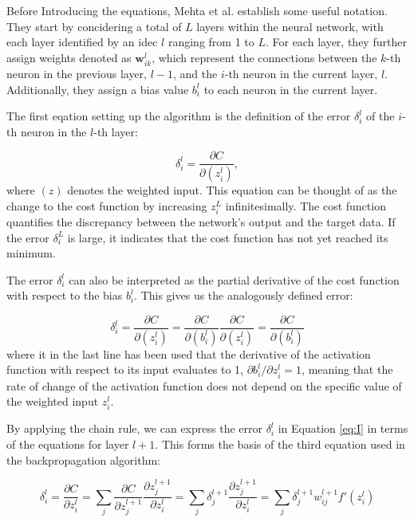 \documentclass[a4paper, UKenglish, 11pt]{uiomaster}
\begin{document}
Before Introducing the equations, Mehta et al. establish some useful notation. They start by concidering a total of $L$ layers within the neural network, with each layer identified by an idec $l$ ranging from 1 to $L$. For each layer, they further assign weights denoted as $\mathbf{w}^l_{ik}$, which represent the connections between the $k$-th neuron in the previous layer, $l-1$, and the $i$-th neuron in the current layer, $l$. Additionally, they assign a bias value $b^l_i$ to each neuron in the current layer.

The first eqation setting up the algorithm is the definition of the error $\delta_i^l$ of the $i$-th neuron in the $l$-th layer:

\begin{equation}
    \delta_i^l = \frac{\partial C}{\partial(z_i^l)},
\label{eq:I}
\end{equation}
where $(z)$ denotes the weighted input. This equation can be thought of as the change to the cost function by increasing $z_i^L$ infinitesimally. The cost function quantifies the discrepancy between the network's output and the target data. If the error $\delta_i^L$ is large, it indicates that the cost function has not yet reached its minimum.

The error $\delta^l_i$ can also be interpreted as the partial derivative of the cost function with respect to the bias $b^l_i$. This gives us the analogously defined error:

\begin{equation}
    \delta_i^l = \frac{\partial C}{\partial(z_i^l)} = \frac{\partial C}{\partial(b_i^l)}\frac{\partial C}{\partial(z_i^l)} = \frac{\partial C}{\partial(b_i^l)}
\label{eq:II}
\end{equation}
where it in the last line has been used that the derivative of the activation function with respect to its input evaluates to 1, $\partial b^l_i / \partial z_i^l = 1$, meaning that the rate of change of the activation function does not depend on the specific value of the weighted input $z_i^l$.

By applying the chain rule, we can express the error $\delta_i^l$ in Equation \ref{eq:I} in terms of the equations for layer $l+1$. This forms the basis of the third equation used in the backpropagation algorithm:

\begin{equation}
\delta_i^l = \frac{\partial C}{\partial z^l_{i}} =
\sum_j \frac{\partial C}{\partial z_j^{l+1}}\frac{\partial z_j^{l+1}}{\partial z_i^l} =
\sum_j \delta_j^{l+1} \frac{\partial z_j^{l+1}}{\partial z_i^l} =
\sum_j \delta_j^{l+1}w_{ij}^{l+1}f'(z_i^l)
\label{eq:III}
\end{equation}
\end{document}
